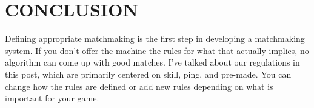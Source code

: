\documentclass[12pt]{report}
\begin{document}



\centering
\section{CONCLUSION }
\justifying
\setlength{\parindent}{4em}
\setlength{\parskip}{0.5em}
\renewcommand{\baselinestretch}{1.5}
\normalsize

\hspace{1.7cm}
Defining appropriate matchmaking is the first step in developing a matchmaking system.
If you don't offer the machine the rules for what that actually implies,
no algorithm can come up with good matches.
I've talked about our regulations in this post,
which are primarily centered on skill, ping, and pre-made.
You can change how the rules are defined or add new rules depending on what is important for your game. 
\\
\vspace{15cm}
\end{document}
